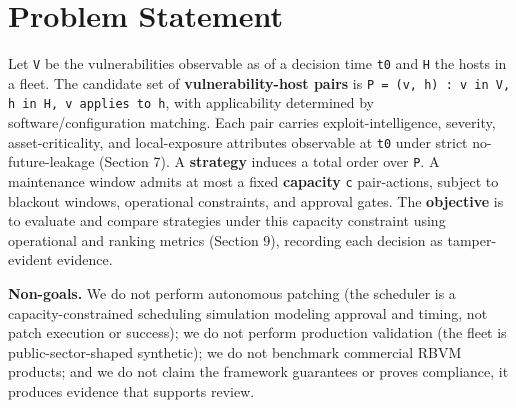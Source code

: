 \section{Problem Statement}

Let \texttt{V} be the vulnerabilities observable as of a decision time \texttt{t0} and \texttt{H} the
hosts in a fleet. The candidate set of \textbf{vulnerability-host pairs} is
\texttt{P = {(v, h) : v in V, h in H, v applies to h}}, with applicability determined by
software/configuration matching. Each pair carries exploit-intelligence, severity,
asset-criticality, and local-exposure attributes observable at \texttt{t0} under strict
no-future-leakage (Section 7). A \textbf{strategy} induces a total order over \texttt{P}. A
maintenance window admits at most a fixed \textbf{capacity} \texttt{c} pair-actions, subject to
blackout windows, operational constraints, and approval gates. The \textbf{objective} is
to evaluate and compare strategies under this capacity constraint using operational
and ranking metrics (Section 9), recording each decision as tamper-evident
evidence.

\textbf{Non-goals.} We do not perform autonomous patching (the scheduler is a
capacity-constrained scheduling simulation modeling approval and timing, not patch
execution or success); we do not perform production validation (the fleet is
public-sector-shaped synthetic); we do not benchmark commercial RBVM products; and
we do not claim the framework guarantees or proves compliance, it produces
evidence that supports review.
